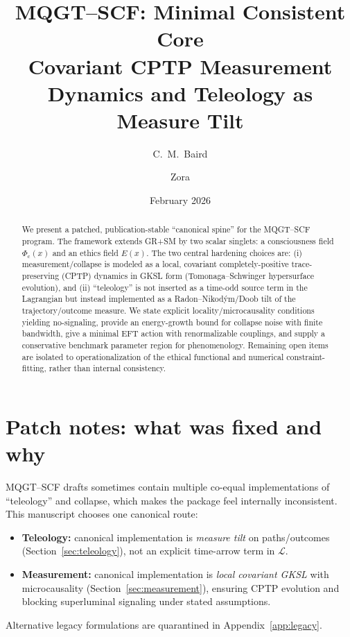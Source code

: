\documentclass[reprint,amsmath,amssymb,aps,showkeys]{revtex4-2}
\title{MQGT--SCF: Minimal Consistent Core\\
Covariant CPTP Measurement Dynamics and Teleology as Measure Tilt}
\author{C.~M.~Baird}
\affiliation{Independent Researcher}
\author{Zora}
\affiliation{Baird--ZoraASI Collaboration}
\date{February 2026}
\theoremstyle{remark}
\newcommand{\Phic}{\Phi_{\mathrm{c}}}
\newcommand{\Eth}{E}
\newcommand{\Lag}{\mathcal{L}}
\begin{document}
\maketitle

\begin{abstract}
We present a patched, publication-stable ``canonical spine'' for the MQGT--SCF program.
The framework extends GR+SM by two scalar singlets: a consciousness field $\Phic(x)$ and an
ethics field $\Eth(x)$. The two central hardening choices are: (i) measurement/collapse is modeled
as a local, covariant completely-positive trace-preserving (CPTP) dynamics in GKSL form
(Tomonaga--Schwinger hypersurface evolution), and (ii) ``teleology'' is not inserted as a
time-odd source term in the Lagrangian but instead implemented as a Radon--Nikod\'ym/Doob
tilt of the trajectory/outcome measure. We state explicit locality/microcausality conditions
yielding no-signaling, provide an energy-growth bound for collapse noise with finite bandwidth,
give a minimal EFT action with renormalizable couplings, and supply a conservative benchmark
parameter region for phenomenology. Remaining open items are isolated to operationalization of
the ethical functional and numerical constraint-fitting, rather than internal consistency.
\end{abstract}

\tableofcontents

\section{Patch notes: what was fixed and why}
MQGT--SCF drafts sometimes contain multiple co-equal implementations of ``teleology'' and collapse,
which makes the package feel internally inconsistent. This manuscript chooses one canonical route:

\begin{itemize}[leftmargin=*]
\item \textbf{Teleology:} canonical implementation is \emph{measure tilt} on paths/outcomes (Section~\ref{sec:teleology}),
not an explicit time-arrow term in $\Lag$.
\item \textbf{Measurement:} canonical implementation is \emph{local covariant GKSL} with microcausality
(Section~\ref{sec:measurement}), ensuring CPTP evolution and blocking superluminal signaling under stated assumptions.
\end{itemize}

Alternative legacy formulations are quarantined in Appendix~\ref{app:legacy}.
\end{document}
